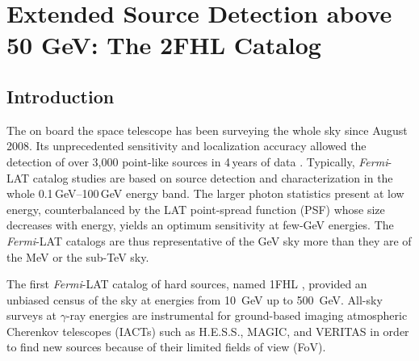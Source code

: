 \chapter{Extended Source Detection above 50 GeV: The 2FHL Catalog}
\label{chap:2FHL}



\section{Introduction}\label{2FHL:intro}
The \lat{} \citep{atwood09} on board the \Fermi{}
\gam{} space telescope has been surveying the whole sky since August 2008.
Its unprecedented sensitivity and localization accuracy allowed the detection
of over 3,000 point-like sources in  4\,years of data \citep[see the
third catalog of {\it Fermi}-LAT sources, 3FGL, ][]{3FGL}.
Typically, {\it Fermi}-LAT catalog studies are based on  source detection
and characterization in the whole 0.1\,GeV--100\,GeV energy band.
The larger photon statistics present at low energy, counterbalanced by
the LAT point-spread function (PSF) whose size decreases with energy,
yields an optimum sensitivity at few-GeV energies.
The {\it Fermi}-LAT catalogs are thus representative of the GeV sky
more than they are of the MeV or the sub-TeV sky.


The first {\it Fermi}-LAT catalog of hard sources, named 1FHL \citep{1FHL}, provided an unbiased census of the sky at energies from 10~GeV up to 500~GeV. %
{ All-sky surveys at $\gamma$-ray energies} are instrumental for ground-based imaging atmospheric Cherenkov telescopes (IACTs) such as H.E.S.S., MAGIC, and VERITAS \citep[][respectively]{holder08,lorenz04,hinton04}
in order to find new sources because of their limited fields of view (FoV).


